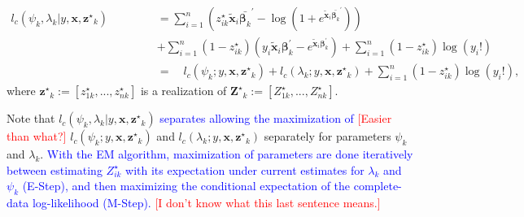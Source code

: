 \documentclass[11pt,letterpaper]{article}
\numberwithin{equation}{section}
\numberwithin{equation}{section}
\numberwithin{equation}{section}
\newcommand{\xTilda}{\tilde{\bm{x}}}
\newcommand{\zZ}{Z^\star}
\newcommand{\zz}{z^\star}
\begin{document}
\begin{equation*}\begin{split}
l_c(\psi_k,\lambda_k|y,\bm{x},{\bm{\zz}_k}) &= \sum_{i=1}^n \left( \zz_{ik}\xTilda_i \bar{\bm{\beta}_k }^{'} - \log\left(1+ e^{ \xTilda_i \bar{\bm{\beta}_k }^{'}}\right) \right)  \\ \qquad\qquad\qquad\qquad\qquad\qquad& + \sum_{i=1}^n (1-\zz_{ik}) (y_i \xTilda_i \bm{\beta}_k^{'}  - e^{\xTilda_i \bm{\beta}_k^{'}})+ \sum_{i=1}^n (1-\zz_{ik})\log(y_i!)\\
&= \quad l_c(\psi_k;y,\bm{x},{{\bm{\zz}_k}}) + l_c(\lambda_k; y,\bm{x},{{\bm{\zz}_k}}) + \sum_{i=1}^n (1- \zz_{ik})\log(y_i!), %
\end{split}\end{equation*}
where $\bm{\zz}_k := \left[\zz_{1k}, ..., \zz_{nk} \right]$ is a realization of $\bm{\zZ}_k  := \left[\zZ_{1k}, ..., \zZ_{nk} \right]$.
 
 Note that $l_c(\psi_k,\lambda_k|y,\bm{x},\bm{\zz}_k)$  \textcolor{blue}{separates allowing the maximization of} \textcolor{red}{[Easier than what?]}   $l_c(\psi_k; y,\bm{x},\bm{\zz}_k) $ and $l_c(\lambda_k; y,\bm{x},\bm{\zz}_k) $ separately for parameters $\psi_k$ and $\lambda_k$. \textcolor{blue}{With the EM algorithm, maximization of parameters are done iteratively between estimating $\zZ_{ik}$ with its expectation under current estimates for $\lambda_k$ and $\psi_k$ (E-Step), and then maximizing the conditional expectation of the complete-data log-likelihood (M-Step). } \textcolor{red}{[I don't know what this last sentence means.]}

\end{document}
